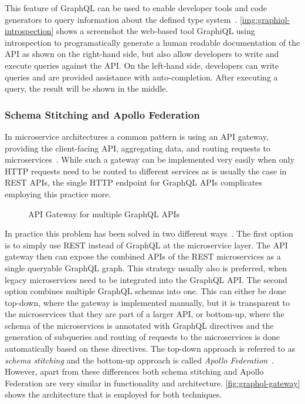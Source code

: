 This feature of GraphQL can be used to enable developer tools and code generators to query information about the defined type system~\cite{Touronen2019}.
\autoref{img:graphiql-introspection} shows a screenshot the web-based tool GraphiQL using introspection to programatically generate a human readable documentation of the \ac{API} as shown on the right-hand side, but also allow developers to write and execute queries against the \ac{API}.
On the left-hand side, developers can write queries and are provided assistance with auto-completion.
After executing a query, the result will be shown in the middle.

\subsubsection{Schema Stitching and Apollo Federation}

In microservice architectures a common pattern is using an \ac{API} gateway, providing the client-facing \ac{API}, aggregating data, and routing requests to microservices~\cite{Taibi2018, Touronen2019}.
While such a gateway can be implemented very easily when only \ac{HTTP} requests need to be routed to different services as is usually the case in \ac{REST} \acp{API}, the single \ac{HTTP} endpoint for GraphQL \acp{API} complicates employing this practice more.

\begin{figure}[!htb]
    \centering
    
    \caption{\ac{API} Gateway for multiple GraphQL \acp{API}~\cite{Touronen2019}}
    \label{fig:graphql-gateway}
\end{figure}

In practice this problem has been solved in two different ways~\cite{Touronen2019}.
The first option is to simply use \ac{REST} instead of GraphQL at the microservice layer.
The \ac{API} gateway then can expose the combined \acp{API} of the \ac{REST} microservices as a single queryable GraphQL graph.
This strategy usually also is preferred, when legacy microservices need to be integrated into the GraphQL \ac{API}.
The second option combines multiple GraphQL schemas into one.
This can either be done top-down, where the gateway is implemented manually, but it is transparent to the microservices that they are part of a larger \ac{API}, or bottom-up, where the schema of the microservices is annotated with GraphQL directives and the generation of subqueries and routing of requests to the microservices is done automatically based on these directives.
The top-down approach is referred to as \textit{schema stitching} and the bottom-up approach is called \textit{Apollo Federation}~\cite{Stubailo2017,Stuenkel2020}.
However, apart from these differences both schema stitching and Apollo Federation are very similar in functionality and architecture.
\autoref{fig:graphql-gateway} shows the architecture that is employed for both techniques.

